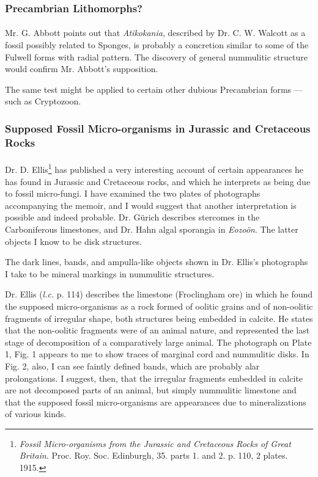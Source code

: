 \documentclass[a4paper, 12pt, oneside]{article}
\begin{document}
\subsubsection{Precambrian Lithomorphs?}
\paragraph{}
Mr. G. Abbott points out that \emph{Atikokania}, described by Dr. C. W. Walcott as a fossil possibly related to Sponges, is probably a concretion similar to some of the Fulwell forms with radial pattern. The discovery of general nummulitic structure would confirm Mr. Abbott's supposition.

The same test might be applied to certain other dubious Precambrian forms --- such as Cryptozoon.

\subsubsection{Supposed Fossil Micro-organisms in Jurassic and Cretaceous Rocks}
\paragraph{}
Dr. D. Ellis\footnote{\emph{Fossil Micro-organisms from the Jurassic and Cretaceous Rocks of Great Britain}. Proc. Roy. Soc. Edinburgh, 35. parts 1. and 2. p. 110, 2 plates. 1915.} has published a very interesting account of certain appearances he has found in Jurassic and Cretaceous rocks, and which he interprets as being due to fossil micro-fungi. I have examined the two plates of photographs accompanying the memoir, and I would suggest that another interpretation is possible and indeed probable. Dr. Gürich describes stercomes in the Carboniferous limestones, and Dr. Hahn algal sporangia in \emph{Eozoön}. The latter objects I know to be disk structures.

The dark lines, bands, and ampulla-like objects shown in Dr. Ellis's photographs I take to be mineral markings in nummulitic structures.

Dr. Ellis (\emph{l.c.} p. 114) describes the limestone (Froclingham ore) in which he found the supposed micro-organisms as a rock formed of oolitic grains and of non-oolitic fragments of irregular shape, both structures being embedded in calcite. He states that the non-oolitic fragments were of an animal nature, and represented the last stage of decomposition of a comparatively large animal. The photograph on Plate 1, Fig. 1 appears to me to show traces of marginal cord and nummulitic disks. In Fig. 2, also, I can see faintly defined bands, which are probably alar prolongations. I suggest, then, that the irregular fragments embedded in calcite are not decomposed parts of an animal, but simply nummulitic limestone and that the supposed fossil micro-organisms are appearances due to mineralizations of various kinds.
\end{document}
